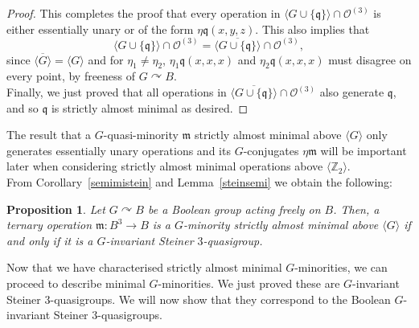 \documentclass{article}
\newtheorem{prop}[theorem]{Proposition}
\theoremstyle{remark}
\theoremstyle{definition}
\def\acts{\curvearrowright}
\begin{document}
\begin{proof}
This completes the proof that every operation in 
$\langle G\cup\{\mathfrak{q}\}\rangle \cap\mathcal{O}^{(3)}$ is either essentially unary or of the form $\eta \mathfrak{q}( x, y, z)$. This also implies that
\[\langle G\cup\{\mathfrak{q}\}\rangle\cap\mathcal{O}^{(3)}=\overline{\langle G\cup\{\mathfrak{q}\}\rangle}\cap\mathcal{O}^{(3)},\]
since $\overline{\langle G\rangle}=\langle G\rangle$ and for $\eta_1\neq\eta_2$, $\eta_1\mathfrak{q}(x,x,x)$ and $\eta_2\mathfrak{q}(x,x,x)$ must disagree on every point, by freeness of $G\acts B$.\\

Finally, we just proved that all operations in $\overline{\langle G\cup\{\mathfrak{q}\}\rangle}\cap\mathcal{O}^{(3)}$ also generate $\mathfrak{q}$, and so $\mathfrak{q}$ is strictly almost minimal as desired. 
\end{proof}

The result that a $G$-quasi-minority $\mathfrak{m}$ strictly almost minimal above $\langle G \rangle$ only generates essentially unary operations and its $G$-conjugates $\eta \mathfrak{m}$ will be important later when considering strictly almost minimal operations above $\langle \mathbb{Z}_2\rangle$.\\

From Corollary~\ref{semimistein} and Lemma~\ref{steinsemi} we obtain the following:

\begin{prop}\label{semichar} Let $G\acts B$ be a Boolean group acting freely on $B$. Then, a ternary operation $\mathfrak{m}:B^3\to B$ is a $G$-minority strictly almost minimal above $\langle G \rangle$ if and only if it is a $G$-invariant Steiner $3$-quasigroup.
\end{prop}

Now that we have characterised strictly almost minimal $G$-minorities, we can proceed to describe minimal $G$-minorities. We just proved these are $G$-invariant Steiner $3$-quasigroups. We will now show that they correspond to the Boolean $G$-invariant Steiner $3$-quasigroups.
\end{document}

